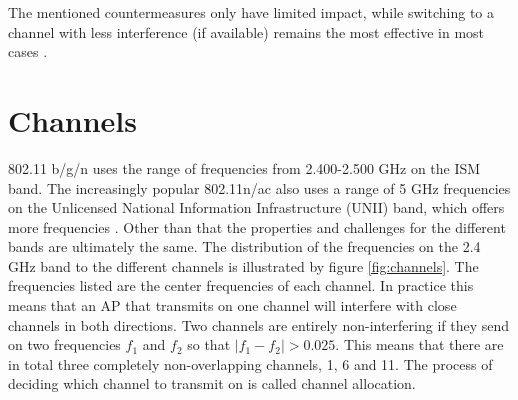 \begin{figure}
	\end{figure}


	The mentioned countermeasures only have limited
	impact, while switching to a channel with less interference (if available) remains the most effective in most cases \cite{impactRF}. 
	\section{Channels} 
	802.11 b/g/n uses the range of frequencies from 2.400-2.500 GHz on the ISM band.
	The increasingly popular 802.11n/ac also uses a range of 5 GHz frequencies on the Unlicensed
	National Information Infrastructure (UNII) band, which offers more frequencies \cite{5ghz}.
	Other than that the properties and challenges for the different bands are ultimately the same.
	The distribution of the frequencies on the 2.4 GHz band to the different channels is illustrated by figure \ref{fig:channels}. The frequencies listed are the center frequencies of each channel. In practice this means that an AP that transmits on one channel will interfere with close channels in both directions. Two channels are entirely non-interfering if they send on two frequencies  $f_{1}$ and $f_{2}$ so that $|f_{1} - f_{2}| > 0.025$. This means that there are in total three completely non-overlapping channels, 1, 6 and 11. The process of deciding which channel to transmit on is called channel allocation. 


